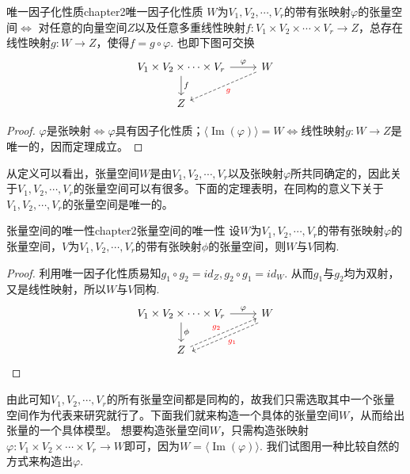 \begin{mythm}{唯一因子化性质}{chapter2唯一因子化性质}
	$W$为$V_{1},V_{2},\cdots,V_{r}$的带有张映射$\varphi$的张量空间$\Leftrightarrow$
	对任意的向量空间$Z$以及任意多重线性映射$f:V_{1}\times V_{2}\times\cdots\times V_{r}\longrightarrow Z$，总存在{\color{red}{唯一的}}线性映射$g:W\longrightarrow Z$，使得$f=g\circ\varphi$. 也即下图可交换
	\[
	\begin{tikzcd}
	V_{1}\times V_{2}\times\cdots\times V_{r} \arrow[r, "\varphi"] \arrow[d, "f", left ] & W \arrow[dl,dashrightarrow, "{\color{red}g}"]\\
	Z  &
	\end{tikzcd} 
	\]
\end{mythm}
\begin{proof}
	$\varphi$是张映射$\Leftrightarrow\varphi$具有因子化性质；$\langle\operatorname{Im}(\varphi) \rangle=W\Leftrightarrow$线性映射$g:W\longrightarrow Z$是唯一的，因而定理成立。
\end{proof}

从定义可以看出，张量空间$W$是由$V_{1},V_{2},\cdots,V_{r}$以及张映射$\varphi$所共同确定的，因此关于$V_{1},V_{2},\cdots,V_{r}$的张量空间可以有很多。下面的定理表明，在同构的意义下关于$V_{1},V_{2},\cdots,V_{r}$的张量空间是唯一的。
\begin{mythm}{张量空间的唯一性}{chapter2张量空间的唯一性}
	设$W$为$V_{1},V_{2},\cdots,V_{r}$的带有张映射$\varphi$的张量空间，$V$为$V_{1},V_{2},\cdots,V_{r}$的带有张映射$\phi$的张量空间，则$W$与$V$同构.
\end{mythm}
\begin{proof}
	利用唯一因子化性质易知$g_{1}\circ g_{2}=id_{Z},g_{2}\circ g_{1}=id_{W}$. 从而$g_{1}$与$g_{2}$均为双射，又是线性映射，所以$W$与$V$同构.
	\[
	\begin{tikzcd}
	V_{1}\times V_{2}\times\cdots\times V_{r} \arrow[r, "\varphi"] \arrow[d, "\phi", left ] & W \arrow[dl, dashrightarrow,shift left=1ex, "{\color{red}g_{1}}"]\\
	Z \arrow[ur, dashrightarrow, "{\color{red}g_{2}}"] &
	\end{tikzcd} 
	\]
\end{proof}

由此可知$V_{1},V_{2},\cdots,V_{r}$的所有张量空间都是同构的，故我们只需选取其中一个张量空间作为代表来研究就行了。下面我们就来构造一个具体的张量空间$W$，从而给出张量的一个具体模型。
想要构造张量空间$W$，只需构造张映射$\varphi:V_{1}\times V_{2}\times\cdots\times V_{r}\longrightarrow W$即可，因为$W=\langle\operatorname{Im}(\varphi) \rangle$. 我们试图用一种比较自然的方式来构造出$\varphi$. 

